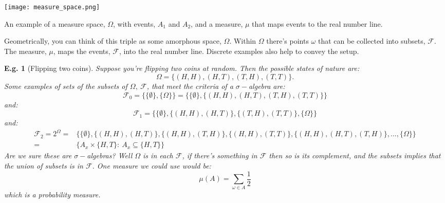 \documentclass{tufte-book}
\theoremstyle{mytheoremstyle}
\theoremstyle{mylemstyle}
\theoremstyle{mydefstyle}
\newtheorem*{ex}{E.g.}
\begin{document}
	\begin{marginfigure}
		\texttt{[image: measure\_space.png]}
		\caption{An example of a measure space, \(\Omega\), with events, \(A_1\) and \(A_2\), and a measure, \(\mu\) that maps events to the real number line.}
	\end{marginfigure}
\noindent Geometrically, you can think of this triple as some amorphous space, \(\Omega\). Within \(\Omega\) there's points \(\omega\) that can be collected into subsets, \(\mathcal{F}\). The measure, \(\mu\), maps the events, \(\mathcal{F}\), into the real number line. Discrete examples also help to convey the setup. 
\begin{ex}[Flipping two coins] Suppose you're flipping two coins at random. Then the possible states of nature are:
	\[\Omega = \{(H, H), (H, T), (T, H), (T, T)\} \text{.}\]
Some examples of sets of the subsets of \(\Omega,\ \mathcal{F}\), that meet the criteria of a \(\sigma-\)algebra are:
	\[\mathcal{F}_0 = \{\{\emptyset\}, \{\Omega\}\} = \{\{\emptyset\}, \{(H, H), (H, T), (T, H), (T, T)\}\}\]
and:
	\[\mathcal{F}_1 = \{\{\emptyset\}, \{(H, H), (H, T)\}, \{(T, H), (T, T)\}, \{\Omega\}\}\]
and:
	\begin{align*}
		\mathcal{F}_2 = 2^\Omega = & \{\{\emptyset\}, \{(H, H), (H, T)\},  \{(H, H), (T,H)\},  \{(H, H), (T, T)\}, \{(H, H), (H, T), (T, H)\}, \dots, \{\Omega\}\} \\
							= & \{A_x \times \{H, T\}:\ A_x \subseteq \{H, T\}\}
	\end{align*}
Are we sure these are \(\sigma-\)algebras? Well \(\Omega\) is in each \(\mathcal{F}\), if there's something in \(\mathcal{F}\) then so is its complement, and the subsets implies that the union of subsets is in \(\mathcal{F}\). One measure we could use would be:
	\[\mu(A) = \sum_{\omega \in A} \frac{1}{2}\]
which is a probability measure. 
\end{ex}
\end{document}
